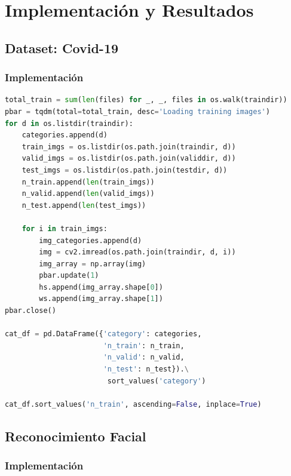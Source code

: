 \chapter{Implementaci\'on y Resultados}
\label{cap:implementacion}

\section{Dataset: Covid-19}
\label{intro:covid}

\subsection{Implementaci\'on}

\begin{lstlisting}[language=python]
total_train = sum(len(files) for _, _, files in os.walk(traindir))
pbar = tqdm(total=total_train, desc='Loading training images')
for d in os.listdir(traindir):
    categories.append(d)
    train_imgs = os.listdir(os.path.join(traindir, d))
    valid_imgs = os.listdir(os.path.join(validdir, d))
    test_imgs = os.listdir(os.path.join(testdir, d))
    n_train.append(len(train_imgs))
    n_valid.append(len(valid_imgs))
    n_test.append(len(test_imgs))

    for i in train_imgs:
        img_categories.append(d)
        img = cv2.imread(os.path.join(traindir, d, i))
        img_array = np.array(img)
        pbar.update(1)
        hs.append(img_array.shape[0])
        ws.append(img_array.shape[1])
pbar.close()

cat_df = pd.DataFrame({'category': categories,
                       'n_train': n_train,
                       'n_valid': n_valid,
                       'n_test': n_test}).\
                        sort_values('category')

cat_df.sort_values('n_train', ascending=False, inplace=True)
\end{lstlisting}

\vspace*{0.5cm}

\clearpage
\section{Reconocimiento Facial} %
\label{intro:face_detector}

\subsection{Implementaci\'on}

